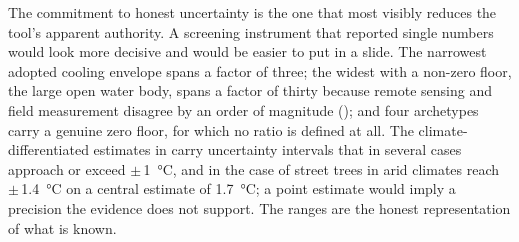 The commitment to honest uncertainty is the one that most visibly reduces the
tool's apparent authority. A screening instrument that reported single numbers
would look more decisive and would be easier to put in a slide. The narrowest
adopted cooling envelope spans a factor of three; the widest with a non-zero
floor, the large open water body, spans a factor of thirty because remote
sensing and field measurement disagree by an order of magnitude
(); and four archetypes carry a genuine zero floor,
for which no ratio is defined at all. The climate-differentiated
estimates
in \textcite{keravec2026} carry uncertainty intervals that in several cases
approach or exceed $\pm\,$\qty{1}{\degreeCelsius}, and in the case of street
trees in arid climates reach $\pm\,$\qty{1.4}{\degreeCelsius} on a central
estimate of \qty{1.7}{\degreeCelsius}; a point estimate would imply a
precision the evidence does not support. The ranges are the honest
representation of what is known.
